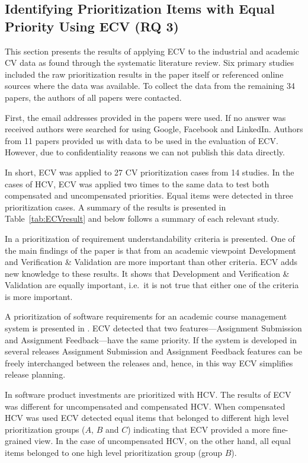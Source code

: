 \subsection{\label{rq3}Identifying Prioritization Items with Equal Priority Using ECV (RQ 3)}
This section presents the results of applying ECV to the industrial and academic CV data as found through the systematic literature review. Six primary studies included the raw prioritization results in the paper itself or referenced online sources where the data was available. To collect the data from the remaining 34 papers, the authors of all papers were contacted.

First, the email addresses provided in the papers were used. If no answer was received authors were searched for using Google, Facebook and LinkedIn. Authors from 11 papers provided us with data to be used in the evaluation of ECV. However, due to confidentiality reasons we can not publish this data directly.

In short, ECV was applied to 27 CV prioritization cases from 14 studies.
In the cases of HCV, ECV was applied two times to the same data to test both compensated and uncompensated priorities. Equal items were detected in three prioritization cases. A summary of the results is presented in Table~\ref{tab:ECVresult} and below follows a summary of each relevant study.

In \cite{Svahnberg2008} a prioritization of requirement understandability criteria is presented.
One of the main findings of the paper is that from an academic viewpoint Development and Verification \& Validation are more important than other criteria.
ECV adds new knowledge to these results.
It shows that Development and Verification \& Validation are equally important, i.e.\ it is not true that either one of the criteria is more important.

A prioritization of software requirements for an academic course management system is presented in \cite{Berander2009a}. ECV detected that two features---Assignment Submission and Assignment Feedback---have the same priority.
If the system is developed in several releases Assignment Submission and Assignment Feedback features can be freely interchanged between the releases and, hence, in this way ECV simplifies release planning.

In \cite{Barney2009} software product investments are prioritized with HCV.
The results of ECV was different for uncompensated and compensated HCV.
When compensated HCV was used ECV detected equal items that belonged to different high level prioritization groups ($A$, $B$ and $C$) indicating that ECV provided a more fine-grained view. In the case of uncompensated HCV, on the other hand, all equal items belonged to one high level prioritization group (group $B$).

